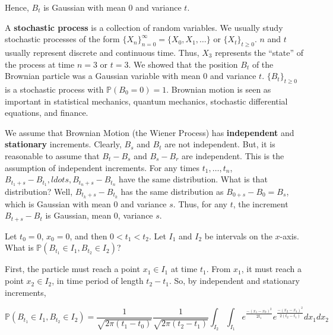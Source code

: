 \documentclass[12pt]{article}
\newcommand{\prob}[1]{\mathbb{P}(#1)}
\begin{document}
\noindent
Hence, $B_t$ is Gaussian with mean $0$ and variance $t$.

\vspace*{.5cm}
\noindent
A \textbf{stochastic process} is a collection of random variables. We usually study stochastic processes of the form $\big \{ X_n \big \}_{n=0}^{\infty} = \big \{ X_0, X_1, \ldots \big \}$ or $\big \{ X_t \big \}_{t \geq 0}$. $n$ and $t$ usually represent discrete and continuous time. Thus, $X_3$ represents the ``state'' of the process at time $n=3$ or $t=3$. We showed that the position $B_t$ of the Brownian particle was a Gaussian variable with mean $0$ and variance $t$. $\big \{ B_t \big \}_{t \geq 0}$ is a stochastic process with $\prob{B_0 = 0} = 1$. Brownian motion is seen as important in statistical mechanics, quantum mechanics, stochastic differential equations, and finance.

\vspace*{.5cm}
\noindent
We assume that Brownian Motion (the Wiener Process) has \textbf{independent} and \textbf{stationary} increments. Clearly, $B_s$ and $B_t$ are not independent. But, it is reasonable to assume that $B_t - B_s$ and $B_s - B_r$ are independent. This is the assumption of independent increments. For any times $t_1, \ldots, t_n$, $B_{t_1 + s} - B_{t_1}, ldots, B_{t_n + s} - B_{t_n}$ have the same distribution. What is that distribution? Well, $B_{t_k + s} - B_{t_k}$ has the same distribution as $B_{0  + s} - B_{0} = B_{s}$, which is Gaussian with mean $0$ and variance $s$. Thus, for any $t$, the increment $B_{t+s} - B_t$ is Gaussian, mean $0$, variance $s$. 

\begin{tcolorbox}
Let $t_0 = 0$, $x_0 = 0$, and then $0 < t_1 < t_2$. Let $I_1$ and $I_2$ be intervals on the $x$-axis. What is $\prob{B_{t_1} \in I_1, B_{t_2} \in I_2}$?

\vspace*{.5cm}
First, the particle must reach a point $x_1 \in I_1$ at time $t_1$. From $x_1$, it must reach a point $x_2 \in I_2$, in time period of length $t_2 - t_1$. So, by independent and stationary increments, 

\begin{equation*}
\prob{B_{t_1} \in I_1, B_{t_2} \in I_2} = \frac{1}{\sqrt{2 \pi (t_1 - t_0)}} \frac{1}{\sqrt{2 \pi (t_2 - t_1)}} \int_{I_2} \int_{I_1} e^{\frac{-(x_1-x_0)^2}{2t_1}} e^{\frac{-(x_2-x_1)^2}{2(t_2 - t_1)}} dx_1 dx_2
\end{equation*}
\end{tcolorbox}
\end{document}
